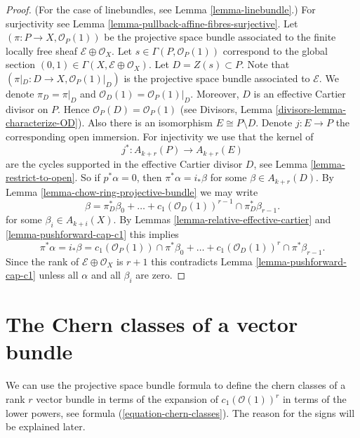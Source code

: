 \begin{proof}
(For the case of linebundles, see Lemma \ref{lemma-linebundle}.)
For surjectivity see Lemma \ref{lemma-pullback-affine-fibres-surjective}.
Let $(\pi  : P \to X, \mathcal{O}_P(1))$
be the projective space bundle associated
to the finite locally free sheaf $\mathcal{E} \oplus \mathcal{O}_X$.
Let $s \in \Gamma(P, \mathcal{O}_P(1))$ correspond to the global
section $(0, 1) \in \Gamma(X, \mathcal{E} \oplus \mathcal{O}_X)$.
Let $D = Z(s) \subset P$. Note that
$(\pi|_D : D \to X , \mathcal{O}_P(1)|_D)$
is the projective space bundle associated
to $\mathcal{E}$. We denote $\pi_D = \pi|_D$ and
$\mathcal{O}_D(1) = \mathcal{O}_P(1)|_D$.
Moreover, $D$ is an effective
Cartier divisor on $P$. Hence $\mathcal{O}_P(D) = \mathcal{O}_P(1)$
(see Divisors, Lemma \ref{divisors-lemma-characterize-OD}).
Also there is an isomorphism
$E \cong P \setminus D$. Denote $j : E \to P$ the
corresponding open immersion.
For injectivity we use that the kernel of
$$
j^* :
A_{k + r}(P)
\longrightarrow
A_{k + r}(E)
$$
are the cycles supported in the effective Cartier divisor $D$,
see Lemma \ref{lemma-restrict-to-open}. So if $p^*\alpha = 0$, then
$\pi^*\alpha = i_*\beta$ for some $\beta \in A_{k + r}(D)$.
By Lemma \ref{lemma-chow-ring-projective-bundle} we may write
$$
\beta = \pi_D^*\beta_0 +
\ldots + c_1(\mathcal{O}_D(1))^{r - 1} \cap \pi_D^* \beta_{r - 1}.
$$
for some $\beta_i \in A_{k + i}(X)$.
By Lemmas \ref{lemma-relative-effective-cartier}
and \ref{lemma-pushforward-cap-c1}
this implies
$$
\pi^*\alpha = i_*\beta =
c_1(\mathcal{O}_P(1)) \cap \pi^*\beta_0 +
\ldots +
c_1(\mathcal{O}_D(1))^r \cap \pi^*\beta_{r - 1}.
$$
Since the rank of $\mathcal{E} \oplus \mathcal{O}_X$ is $r + 1$
this contradicts Lemma \ref{lemma-pushforward-cap-c1} unless all
$\alpha$ and all $\beta_i$ are zero.
\end{proof}








\section{The Chern classes of a vector bundle}
\label{section-chern-classes-vector-bundles}

\noindent
We can use the projective space bundle formula to define the
chern classes of a rank $r$ vector bundle in terms of the expansion
of $c_1(\mathcal{O}(1))^r$ in terms of the lower powers, see
formula (\ref{equation-chern-classes}).
The reason for the signs will be explained later.

